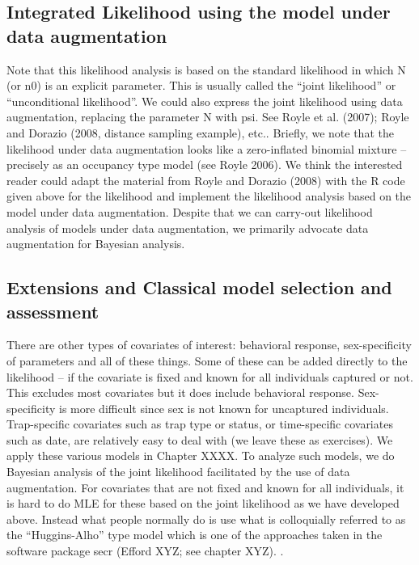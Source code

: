 \subsection{Integrated Likelihood using the model under data augmentation } 

Note that this likelihood analysis is based on the standard likelihood
in which N (or n0) is an explicit parameter. This is usually called
the “joint likelihood” or “unconditional likelihood”.  We could also
express the joint likelihood using data augmentation, replacing the
parameter N with psi. See Royle et al. (2007); Royle and Dorazio
(2008, distance sampling example), etc.. Briefly, we note that the
likelihood under data augmentation looks like a zero-inflated binomial
mixture – precisely as an occupancy type model (see Royle 2006).  We
think the interested reader could adapt the material from Royle and
Dorazio (2008) with the R code given above for the likelihood and
implement the likelihood analysis based on the model under data
augmentation. Despite that we can carry-out likelihood analysis of
models under data augmentation, we primarily advocate data
augmentation for Bayesian analysis.


\subsection{ Extensions and Classical model selection and assessment}

There are other types of covariates of interest: behavioral response,
sex-specificity of parameters and all of these things. Some of these
can be added directly to the likelihood – if the covariate is fixed
and known for all individuals captured or not. This excludes most
covariates but it does include behavioral response. Sex-specificity is
more difficult since sex is not known for uncaptured
individuals. Trap-specific covariates such as trap type or status, or
time-specific covariates such as date, are relatively easy to deal
with (we leave these as exercises).  We apply these various models in
Chapter XXXX. To analyze such models, we do Bayesian analysis of the
joint likelihood facilitated by the use of data augmentation. For
covariates that are not fixed and known for all individuals, it is
hard to do MLE for these based on the joint likelihood as we have
developed above. Instead what people normally do is use what is
colloquially referred to as the “Huggins-Alho” type model which is one
of the approaches taken in the software package secr (Efford XYZ; see
chapter XYZ). .

